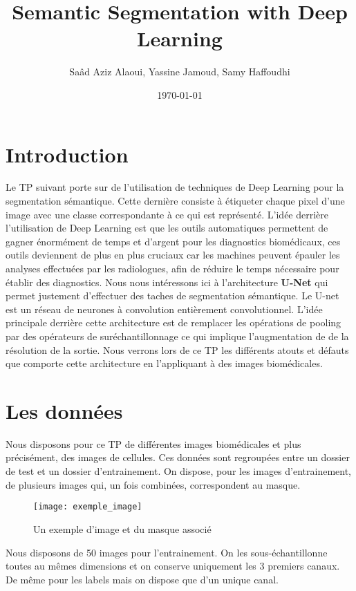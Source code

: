 \documentclass[12pt,a4paper,titlepage]{article}
\title{Semantic Segmentation with Deep Learning}
\author{Saâd Aziz Alaoui, Yassine Jamoud, Samy Haffoudhi}
\date{\today}
\begin{document}
\maketitle

\section*{Introduction}

Le TP suivant porte sur de l'utilisation de techniques de Deep Learning pour la segmentation
sémantique. Cette dernière consiste à étiqueter chaque pixel d’une image avec une classe
correspondante à ce qui est représenté. L'idée derrière l'utilisation de Deep Learning est que
les outils automatiques permettent de gagner énormément de temps et d'argent pour les diagnostics
biomédicaux, ces outils deviennent de plus en plus cruciaux car les machines peuvent épauler
les analyses effectuées par les radiologues, afin de réduire le temps nécessaire pour établir
des diagnostics. Nous nous intéressons ici à l'architecture \textbf{U-Net} qui permet justement d'effectuer
des taches de segmentation sémantique. Le U-net est un réseau de neurones à convolution entièrement
convolutionnel. L'idée principale derrière cette architecture est de remplacer les opérations
de pooling par des opérateurs de suréchantillonnage ce qui implique l'augmentation de de la
résolution de la sortie. Nous verrons lors de ce TP les différents atouts et défauts que comporte
cette architecture en l'appliquant à des images biomédicales.

\section{Les données}

Nous disposons pour ce TP de différentes images biomédicales et plus précisément, des
images de cellules. Ces données sont regroupées entre un dossier de test et un dossier
d'entrainement. On dispose, pour les images d'entrainement, de plusieurs images qui, un
fois combinées, correspondent au masque.

\begin{figure}[H]
    \caption{Un exemple d'image et du masque associé}
    \texttt{[image: exemple\_image]}
    \centering
\end{figure}

Nous disposons de 50 images pour l'entrainement. On les sous-échantillonne toutes
au mêmes dimensions et on conserve uniquement les 3 premiers canaux. De même pour
les labels mais on dispose que d'un unique canal.
\end{document}
